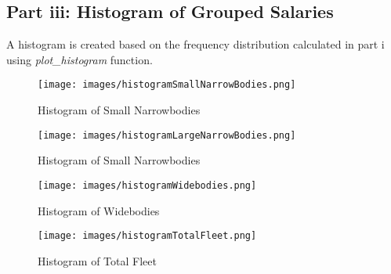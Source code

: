 \subsection{Part iii: Histogram of Grouped Salaries}
A histogram is created  based on the frequency distribution calculated in part i
using \textit{plot\_histogram} function.



\begin{figure}[H]
    \centering
    \texttt{[image: images/histogramSmallNarrowBodies.png]}
    \caption{Histogram of Small Narrowbodies}
\end{figure}
\begin{figure}[H]
    \centering
    \texttt{[image: images/histogramLargeNarrowBodies.png]}
    \caption{Histogram of Small Narrowbodies}
\end{figure}
\begin{figure}[H]
    \centering
    \texttt{[image: images/histogramWidebodies.png]}
    \caption{Histogram of Widebodies}
\end{figure}
\begin{figure}[H]
    \centering
    \texttt{[image: images/histogramTotalFleet.png]}
    \caption{Histogram of Total Fleet}
\end{figure}
